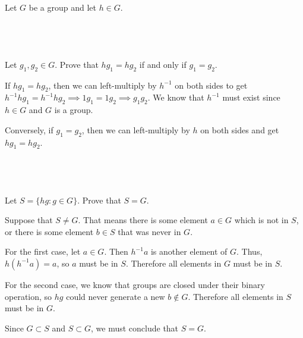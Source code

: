 \documentclass[a4paper]{article}
\begin{document}

\begin{questionbody}
Let $G$ be a group and let $h \in G$.
\end{questionbody}

\subsection{~} %

\begin{questionbody}
Let $g_1, g_2 \in G$. Prove that $h g_1 = h g_2$ if and only if $g_1 = g_2$.
\end{questionbody}

If $h g_1 = h g_2$, then we can left-multiply by $h^{-1}$ on both sides to get $h^{-1} h g_1 = h^{-1} h g_2 \implies 1 g_1 = 1 g_2 \implies g_1 g_2$. We know that $h^{-1}$ must exist since $h \in G$ and $G$ is a group.

Conversely, if $g_1 = g_2$, then we can left-multiply by $h$ on both sides and get $h g_1 = h g_2$.

\subsection{~} %

\begin{questionbody}
Let $S = \{hg : g \in G\}$. Prove that $S = G$.
\end{questionbody}

Suppose that $S \ne G$. That means there is some element $a \in G$ which is not in $S$, or there is some element $b \in S$ that was never in $G$.

For the first case, let $a \in G$. Then $h^{-1} a$ is another element of $G$. Thus, $h \left( h^{-1} a \right) = a$, so $a$ must be in $S$. Therefore all elements in $G$ must be in $S$.

For the second case, we know that groups are closed under their binary operation, so $hg$ could never generate a new $b \notin G$. Therefore all elements in $S$ must be in $G$.

Since $G \subset S$ and $S \subset G$, we must conclude that $S = G$.
\end{document}
